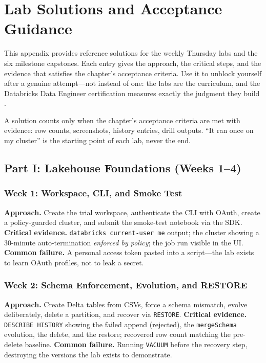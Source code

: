 \chapter{Lab Solutions and Acceptance Guidance}
%
This appendix provides reference solutions for the weekly Thursday labs and the six milestone
capstones. Each entry gives the approach, the critical steps, and the evidence that satisfies the
chapter's acceptance criteria. Use it to unblock yourself after a genuine attempt---not instead
of one: the labs are the curriculum, and the Databricks Data Engineer certification measures
exactly the judgment they build \cite{databricksCertification}.

\begin{notebox}
A solution counts only when the chapter's acceptance criteria are met with evidence: row counts,
screenshots, history entries, drill outputs. ``It ran once on my cluster'' is the starting point
of each lab, never the end.
\end{notebox}

\section{Part I: Lakehouse Foundations (Weeks 1--4)}
\subsection{Week 1: Workspace, CLI, and Smoke Test}
\textbf{Approach.} Create the trial workspace, authenticate the CLI with OAuth, create a
policy-guarded cluster, and submit the smoke-test notebook via the SDK.
\textbf{Critical evidence.} \texttt{databricks current-user me} output; the cluster showing a
30-minute auto-termination \emph{enforced by policy}; the job run visible in the UI.
\textbf{Common failure.} A personal access token pasted into a script---the lab exists to learn
OAuth profiles, not to leak a secret.

\subsection{Week 2: Schema Enforcement, Evolution, and RESTORE}
\textbf{Approach.} Create Delta tables from CSVs, force a schema mismatch, evolve deliberately,
delete a partition, and recover via \texttt{RESTORE}.
\textbf{Critical evidence.} \texttt{DESCRIBE HISTORY} showing the failed append (rejected), the
\texttt{mergeSchema} evolution, the delete, and the restore; recovered row count matching the
pre-delete baseline.
\textbf{Common failure.} Running \texttt{VACUUM} before the recovery step, destroying the versions
the lab exists to demonstrate.

